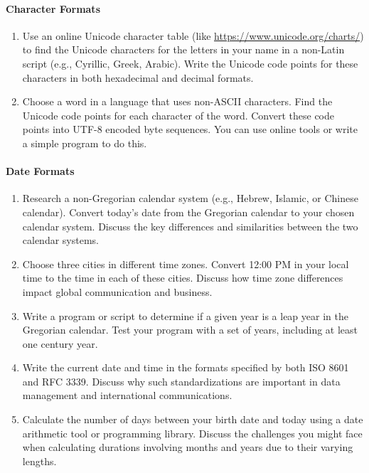 \paragraph*{Character Formats}
\begin{enumerate}
	\item Use an online Unicode character table (like \url{https://www.unicode.org/charts/}) to find the Unicode characters for the letters in your name in a non-Latin script (e.g., Cyrillic, Greek, Arabic). Write the Unicode code points for these characters in both hexadecimal and decimal formats.
	\item Choose a word in a language that uses non-ASCII characters. Find the Unicode code points for each character of the word. Convert these code points into UTF-8 encoded byte sequences. You can use online tools or write a simple program to do this.
\end{enumerate}
\paragraph*{Date Formats}
\begin{enumerate}
    \item Research a non-Gregorian calendar system (e.g., Hebrew, Islamic, or Chinese calendar). Convert today's date from the Gregorian calendar to your chosen calendar system. Discuss the key differences and similarities between the two calendar systems.
    \item Choose three cities in different time zones. Convert 12:00 PM in your local time to the time in each of these cities. Discuss how time zone differences impact global communication and business.
    \item Write a program or script to determine if a given year is a leap year in the Gregorian calendar. Test your program with a set of years, including at least one century year.
    \item Write the current date and time in the formats specified by both ISO 8601 and RFC 3339. Discuss why such standardizations are important in data management and international communications.
    \item Calculate the number of days between your birth date and today using a date arithmetic tool or programming library. Discuss the challenges you might face when calculating durations involving months and years due to their varying lengths.
\end{enumerate}
